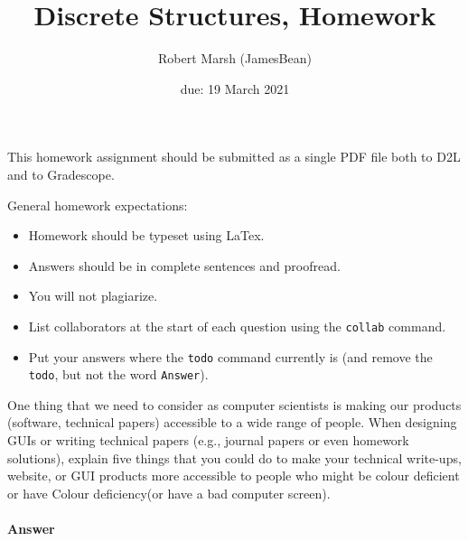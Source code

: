 \documentclass{article}
\title{Discrete Structures, Homework \hwnum}
\author{Robert Marsh (JamesBean)}
\date{due: 19 March 2021}
\begin{document}
\maketitle

This homework assignment should be
submitted as a single PDF file both to D2L and to Gradescope.

General homework expectations:
\begin{itemize}
    \item Homework should be typeset using LaTex.
    \item Answers should be in complete sentences and proofread.
    \item You will not plagiarize.
    \item List collaborators at the start of each question using the \texttt{collab} command.
    \item Put your answers where the \texttt{todo} command currently is (and
        remove the \texttt{todo}, but not the word \texttt{Answer}).
\end{itemize}


\collab{} 

One thing that we need to consider as computer scientists is making our products
(software, technical papers) accessible to a wide range of people. When
designing GUIs or writing technical papers (e.g., journal papers or even
homework solutions), explain five things that you could do to make your
technical write-ups, website, or GUI products more accessible to people who
might be colour deficient or have Colour deficiency(or have a bad computer screen).


\paragraph{Answer}
\end{document}

